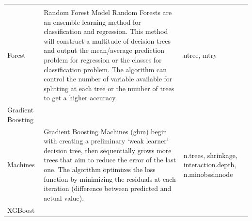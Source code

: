 \documentclass[11pt,]{article}
\begin{document}
\begin{longtable}[]{@{}lll@{}}
\begin{minipage}[t]{0.73\columnwidth}
\strut
\end{minipage} & \begin{minipage}[t]{0.13\columnwidth}\raggedright
\strut
\end{minipage}\tabularnewline
\begin{minipage}[t]{0.05\columnwidth}\raggedright
Forest\strut
\end{minipage} & \begin{minipage}[t]{0.73\columnwidth}\raggedright
Random Forest Model Random Forests are an ensemble learning method for
classification and regression. This method will construct a multitude of
decision trees and output the mean/average prediction problem for
regression or the classes for classification problem. The algorithm can
control the number of variable available for splitting at each tree or
the number of trees to get a higher accuracy.\strut
\end{minipage} & \begin{minipage}[t]{0.13\columnwidth}\raggedright
ntree, mtry\strut
\end{minipage}\tabularnewline
\begin{minipage}[t]{0.05\columnwidth}\raggedright
Gradient Boosting\strut
\end{minipage} & \begin{minipage}[t]{0.73\columnwidth}\raggedright
\strut
\end{minipage} & \begin{minipage}[t]{0.13\columnwidth}\raggedright
\strut
\end{minipage}\tabularnewline
\begin{minipage}[t]{0.05\columnwidth}\raggedright
Machines\strut
\end{minipage} & \begin{minipage}[t]{0.73\columnwidth}\raggedright
Gradient Boosting Machines (gbm) begin with creating a preliminary `weak
learner' decision tree, then sequentially grows more trees that aim to
reduce the error of the last one. The algorithm optimizes the loss
function by minimizing the residuals at each iteration (difference
between predicted and actual value).\strut
\end{minipage} & \begin{minipage}[t]{0.13\columnwidth}\raggedright
n.trees, shrinkage, interaction.depth, n.minobssinnode\strut
\end{minipage}\tabularnewline
\begin{minipage}[t]{0.05\columnwidth}\raggedright
XGBoost\strut
\end{minipage} & \begin{minipage}[t]{0.73\columnwidth}\raggedright

\end{minipage}
\end{longtable}
\end{document}
